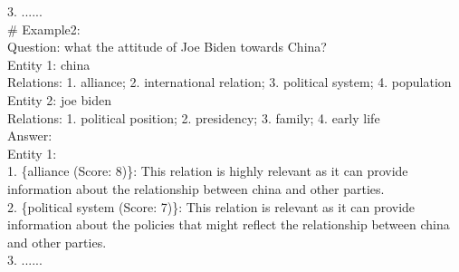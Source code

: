 \documentclass[11pt,UTF8,fontset=fandol]{ctexart}
\begin{document}
\begin{promptbox}
3. ......\\[0.3em]
\# Example2:\\
Question: what the attitude of Joe Biden towards China?\\
Entity 1: china\\
Relations: 1. alliance; 2. international relation; 3. political system; 4. population\\
Entity 2: joe biden\\
Relations: 1. political position; 2. presidency; 3. family; 4. early life\\
Answer:\\
Entity 1:\\
1. \{alliance (Score: 8)\}: This relation is highly relevant as it can provide information about the relationship between china and other parties.\\
2. \{political system (Score: 7)\}: This relation is relevant as it can provide information about the policies that might reflect the relationship between china and other parties.\\
3. ......
\end{promptbox}
\end{document}
